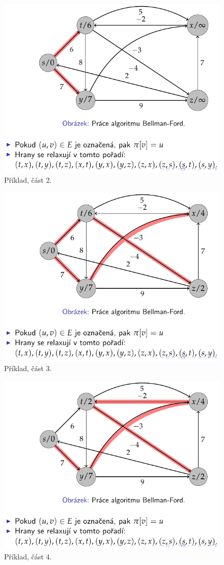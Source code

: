 \begin{figure}[H]
    \centering
    \includegraphics[width=0.75\linewidth]{example_bellman_ford_p2.pdf}
    \caption{Příklad, část 2.}
\end{figure}

\begin{figure}[H]
    \centering
    \includegraphics[width=0.75\linewidth]{example_bellman_ford_p3.pdf}
    \caption{Příklad, část 3.}
\end{figure}

\begin{figure}[H]
    \centering
    \includegraphics[width=0.75\linewidth]{example_bellman_ford_p4.pdf}
    \caption{Příklad, část 4.}
\end{figure}

